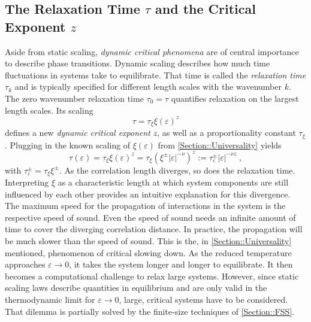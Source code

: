 	\subsection{The Relaxation Time $\tau$ and the Critical Exponent $z$}
	Aside from static scaling, \textit{dynamic critical phenomena} are of central importance to describe phase transitions. Dynamic scaling describes how much time fluctuations in systems take to equilibrate. That time is called the  \textit{relaxation time} $\tau_k$ and is typically specified for different length scales with the wavenumber $k$. The zero wavenumber relaxation time $\tau_0 =	\tau$ quantifies relaxation on the largest length scales. Its scaling \cite{hohenberg1977theory}
	\begin{equation}
		\tau =	\tau_\xi \xi(\varepsilon)^z
	\end{equation}
	defines a new \textit{dynamic critical exponent} $z$, as well as a proportionality constant $\tau_\xi$. Plugging in the known scaling of $\xi(\varepsilon)$ from \autoref{Section::Universality} yields
	\begin{equation}
		\tau(\varepsilon) = \tau_\xi \xi(\varepsilon)^z =\tau_\xi	\left(\xi^{\pm} |\varepsilon|^{-\nu}\right)^z :=	\tau_\varepsilon^\pm |\varepsilon|^{-\nu z} ~,
	\end{equation}
	with $\tau_\varepsilon^\pm =	\tau_\xi \xi^\pm$.
	As the correlation length diverges, so does the relaxation time. Interpreting $\xi$ as a characteristic length at which system components are still influenced by each other provides an intuitive explanation for this divergence. The maximum speed for the propagation of interactions in the system is the respective speed of sound. Even the speed of sound needs an infinite amount of time to cover the diverging correlation distance. In practice, the propagation will be much slower than the speed of sound. This is the, in \autoref{Section::Universality} mentioned, phenomenon of critical slowing down. As the reduced temperature approaches $\varepsilon \rightarrow 0$, it takes the system longer and longer to equilibrate. It then becomes a computational challenge to relax large systems. However, since static scaling laws describe quantities in equilibrium and are only valid in the thermodynamic limit for $\varepsilon \rightarrow 0$, large, critical systems have to be considered.  That dilemma is partially solved by the finite-size techniques of \autoref{Section::FSS}. \\
	
